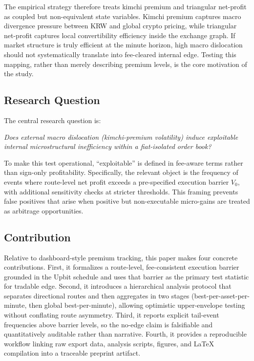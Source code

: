 \documentclass[11pt,a4paper]{article}
\begin{document}
The empirical strategy therefore treats kimchi premium and triangular net-profit as coupled but non-equivalent state variables. Kimchi premium captures macro divergence pressure between KRW and global crypto pricing, while triangular net-profit captures local convertibility efficiency inside the exchange graph. If market structure is truly efficient at the minute horizon, high macro dislocation should not systematically translate into fee-cleared internal edge. Testing this mapping, rather than merely describing premium levels, is the core motivation of the study.

\subsection{Research Question}
The central research question is:

\emph{Does external macro dislocation (kimchi-premium volatility) induce exploitable internal microstructural inefficiency within a fiat-isolated order book?}

To make this test operational, ``exploitable'' is defined in fee-aware terms rather than sign-only profitability. Specifically, the relevant object is the frequency of events where route-level net profit exceeds a pre-specified execution barrier $V_0$, with additional sensitivity checks at stricter thresholds. This framing prevents false positives that arise when positive but non-executable micro-gains are treated as arbitrage opportunities.

\subsection{Contribution}
Relative to dashboard-style premium tracking, this paper makes four concrete contributions. First, it formalizes a route-level, fee-consistent execution barrier grounded in the Upbit schedule and uses that barrier as the primary test statistic for tradable edge. Second, it introduces a hierarchical analysis protocol that separates directional routes and then aggregates in two stages (best-per-asset-per-minute, then global best-per-minute), allowing optimistic upper-envelope testing without conflating route asymmetry. Third, it reports explicit tail-event frequencies above barrier levels, so the no-edge claim is falsifiable and quantitatively auditable rather than narrative. Fourth, it provides a reproducible workflow linking raw export data, analysis scripts, figures, and LaTeX compilation into a traceable preprint artifact.
\end{document}
